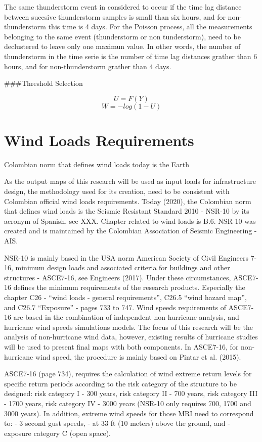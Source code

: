 \documentclass[12pt,twoside]{reedthesis}
\begin{document}
The same thunderstorm event in considered to occur if the time lag distance between sucesive thunderstorm samples is small than six hours, and for non-thunderstorm this time is 4 days. For the Poisson process, all the measurements belonging to the same event (thunderstorm or non tunderstorm), need to be declustered to leave only one maximun value. In other words, the number of thunderstorm in the time serie is the number of time lag distances grather than 6 hours, and for non-thunderstorm grather than 4 days.

\#\#\#Threshold Selection

\[U=F(Y)\]
\[W = -log(1-U)\]

\hypertarget{wind-loads-requirements}{%
\section{Wind Loads Requirements}\label{wind-loads-requirements}}

Colombian norm that defines wind loads today is the Earth

As the output maps of this research will be used as input loads for infrastructure design, the methodology used for its creation, need to be consistent with Colombian official wind loads requirements. Today (2020), the Colombian norm that defines wind loads is the Seismic Resistant Standard 2010 - NSR-10 by its acronym of Spanish, see XXX. Chapter related to wind loads is B.6. NSR-10 was created and is maintained by the Colombian Association of Seismic Engineering - AIS.

NSR-10 is mainly based in the USA norm American Society of Civil Engineers 7-16, minimum design loads and associated criteria for buildings and other structures - ASCE7-16, see Engineers (2017). Under these circumstances, ASCE7-16 defines the minimum requirements of the research products. Especially the chapter C26 - ``wind loads - general requirements'', C26.5 ``wind hazard map'', and C26.7 ``Exposure'' - pages 733 to 747. Wind speeds requirements of ASCE7-16 are based in the combination of independent non-hurricane analysis, and hurricane wind speeds simulations models. The focus of this research will be the analysis of non-hurricane wind data, however, existing results of hurricane studies will be used to present final maps with both components. In ASCE7-16, for non-hurricane wind speed, the procedure is mainly based on Pintar et al. (2015).

ASCE7-16 (page 734), requires the calculation of wind extreme return levels for specific return periods according to the risk category of the structure to be designed: risk category I - 300 years, risk category II - 700 years, risk category III - 1700 years, risk category IV - 3000 years (NSR-10 only requires 700, 1700 and 3000 years). In addition, extreme wind speeds for those MRI need to correspond to: - 3 second gust speeds, - at 33 ft (10 meters) above the ground, and - exposure category C (open space).
\end{document}
